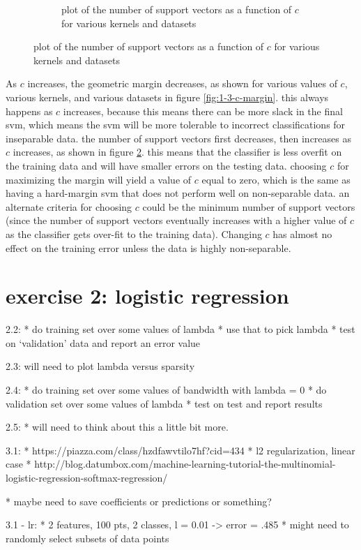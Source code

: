\documentclass[10pt]{article}
\begin{document}
\begin{figure}[!ht]
\begin{subfigure}[b]{0.46\textwidth}
	\caption{plot of the number of support vectors as a function of $c$ for various kernels and datasets}
	\label{fig:1-3-support-vectors}
\end{subfigure}
\end{figure}

As $c$ increases, the geometric margin decreases, as shown for various values of $c$, various kernels, and various datasets in figure \ref{fig:1-3-c-margin}. this always happens as $c$ increases, because this means there can be more slack in the final svm, which means the svm will be more tolerable to incorrect classifications for inseparable data. the number of support vectors first decreases, then increases as $c$ increases, as shown in figure \ref{fig:1-3-support-vectors}. this means that the classifier is less overfit on the training data and will have smaller errors on the testing data. choosing $c$ for maximizing the margin will yield a value of $c$ equal to zero, which is the same as having a hard-margin svm that does not perform well on non-separable data. an alternate criteria for choosing $c$ could be the minimum number of support vectors (since the number of support vectors eventually increases with a higher value of $c$ as the classifier gets over-fit to the training data). Changing $c$ has almost no effect on the training error unless the data is highly non-separable.

\section{exercise 2: logistic regression}

2.2: 
* do training set over some values of lambda
* use that to pick lambda
* test on `validation' data and report an error value

2.3:
will need to plot lambda versus sparsity

2.4:
* do training set over some values of bandwidth with lambda = 0
* do validation set over some values of lambda
* test on test and report results

2.5:
* will need to think about this a little bit more.

3.1:
* https://piazza.com/class/hzdfawvtilo7hf?cid=434
* l2 regularization, linear case
* http://blog.datumbox.com/machine-learning-tutorial-the-multinomial-logistic-regression-softmax-regression/

* maybe need to save coefficients or predictions or something?

3.1 - lr:
* 2 features, 100 pts, 2 classes, l = 0.01 -> error = .485
* might need to randomly select subsets of data points
\end{document}
